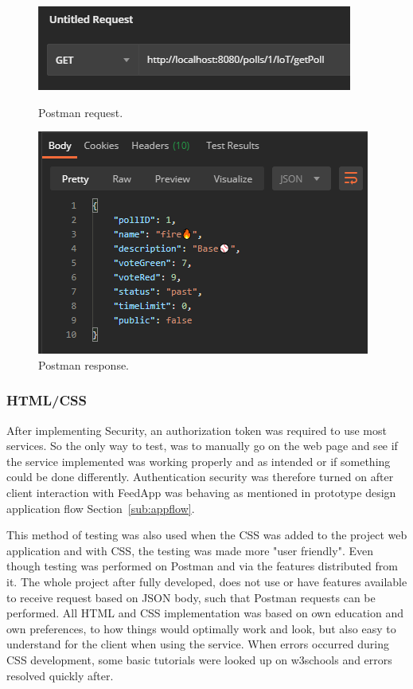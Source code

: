 \begin{figure}[H]
  \centering
  \begin{minipage}{0.4\textwidth}
    \includegraphics[width=\textwidth]{figs/postmanrequest.png}
    \caption{Postman request.}
    \label{fig:postmanrequest}
  \end{minipage}
  \hfill
  \begin{minipage}{0.4\textwidth}
    \includegraphics[width=\textwidth]{figs/postmanresponse.png}
    \caption{Postman response.}
    \label{fig:postmanresponse}
  \end{minipage}
\end{figure}

\subsubsection{HTML/CSS}
After implementing Security, an authorization token was required to use most services. So the only way to test, was to manually go on the web page and see if the service implemented was working properly and as intended or if something could be done differently. Authentication security was therefore turned on after client interaction with FeedApp was behaving as mentioned in prototype design application flow Section~\ref{sub:appflow}.

This method of testing was also used when the CSS was added to the project web application and with CSS, the testing was made more "user friendly". Even though testing was performed on Postman and via the features distributed from it. The whole project after fully developed, does not use or have features available to receive request based on JSON body, such that Postman requests can be performed. All HTML and CSS implementation was based on own education and own preferences, to how things would optimally work and look, but also easy to understand for the client when using the service. When errors occurred during CSS development, some basic tutorials were looked up on w3schools \cite{w3css} and errors resolved quickly after.

